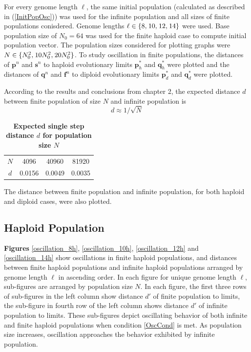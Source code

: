 For every genome length $\ell$, the same initial population (calculated as described in (\ref{InitPopOsc})) was used for the infinite population and all 
sizes of finite populations conisdered.
Genome lengths $\ell \in \{8, \hspace{0.01in}10, \hspace{0.01in}12, \hspace{0.01in}14\}$ were used. Base population size of $N_0 = 64$ was used 
for the finite haploid case to compute initial population vector. The population sizes considered for plotting 
graphs were $N \in \{N_0^2, \hspace{0.01in}10N_0^2, \hspace{0.01in}20N_0^2\}$. 
To study oscillation in finite populations, the distances of $\bm{p}^n$ and $\bm{s}^n$ to haploid evolutionary limits $\bm{p}_h^{\ast}$ and 
$\bm{q}_h^{\ast}$ were plotted and the distances of $\bm{q}^n$ and 
$\bm{f}^n$ to diploid evolutionary limits $\bm{p}_d^{\ast}$ and $\bm{q}_d^{\ast}$ were plotted. 

According to the results and conclusions from 
chapter 2, the expected distance $d$ between finite population of size $N$ and infinite population is 
\[
d \approx 1/\sqrt{N}
\]
\begin{table}[H]
\caption{\textbf{Expected single step distance $d$ for population size $N$}}
\centering
\begin{tabular}{c c c c}
\hline
$N$ & 4096 & 40960 & 81920 \\
$d$ & 0.0156 & 0.0049 & 0.0035 \\
\hline
\end{tabular}
\label{tableExpectedDistance}
\end{table}
The distance between finite population and infinite population, for both haploid and diploid cases, were also plotted. 
\subsection{Haploid Population}


\clearpage

\textbf{ Figures} \ref{oscillation_8h}, \ref{oscillation_10h}, \ref{oscillation_12h} and
\ref{oscillation_14h} show oscillations in finite haploid populations, and distances 
between finite haploid populations and infinite haploid populations arranged by genome length $\ell$ in ascending order. 
In each figure for unique genome length $\ell$, sub-figures 
are arranged by population size $N$. In each figure, the first three rows of sub-figures in the left column show distance $d'$ of finite population 
to limits, the sub-figure in fourth row of the left column shows distance $d'$ of infinite population to limits. These sub-figures depict 
oscillating behavior of both infinite and finite haploid populations when condition \ref{OscCond} is met. 
As population size increases, oscillation approaches the behavior exhibited by infinite population. 

